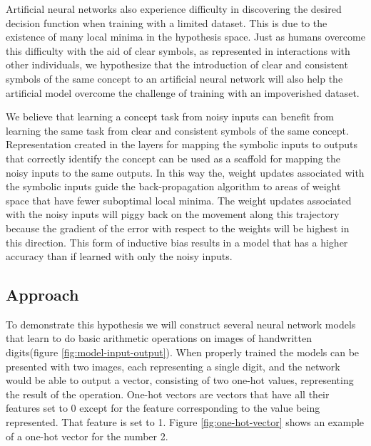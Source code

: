 \documentclass{article}
\begin{document}
	Artificial neural networks also experience difficulty in discovering the desired decision function when training with a limited dataset. This is due to the existence of many local minima in the hypothesis space. Just as humans overcome this difficulty with the aid of clear symbols, as represented in interactions with other individuals, we hypothesize that the introduction of clear and consistent symbols of the same concept to an artificial neural network will also help the artificial model overcome the challenge of training with an impoverished dataset.
	
	We believe that learning a concept task from noisy inputs can benefit from learning the same task from clear and consistent symbols of the same concept.  Representation created in the layers for mapping the symbolic inputs to outputs that correctly identify the concept can be used as a scaffold for mapping the noisy inputs to the same outputs. In this way the, weight updates associated with the symbolic inputs guide the back-propagation algorithm to areas of weight space that have fewer suboptimal local minima. The weight updates associated with the noisy inputs will piggy back on the movement along this trajectory because the gradient of the error with respect to the weights will be highest in this direction. This form of inductive bias results in a model that has a higher accuracy than if learned with only the noisy inputs.
	
	\subsection{Approach}
	
	To demonstrate this hypothesis we will construct several neural network models that learn to do basic arithmetic operations on images of handwritten digits(figure \ref{fig:model-input-output}). When properly trained the models can be presented with two images, each representing a single digit, and the network would be able to output a vector, consisting of two one-hot values, representing the result of the operation. One-hot vectors are vectors that have all their features set to 0 except for the feature corresponding to the value being represented. That feature is set to 1. Figure \ref{fig:one-hot-vector} shows an example of a one-hot vector for the number 2.
	
\end{document}
